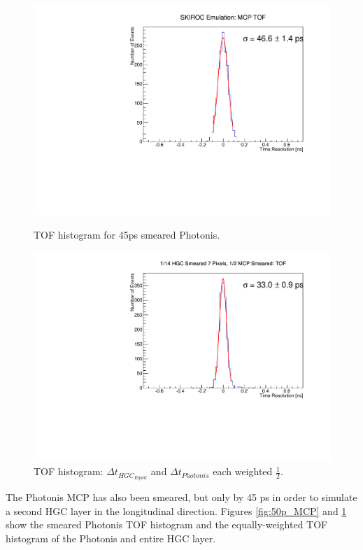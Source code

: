 \documentclass[12pt]{article}
\begin{document}
\begin{figure}[h]
\centering
\begin{minipage}[t]{.49\textwidth}
	\centering
	\includegraphics[width=\linewidth]{SKIROC/deltaTMCPSmear50.pdf}
	\caption{TOF histogram for 45ps smeared Photonis.}
	\label{fig:50p_MCP}
\end{minipage}\hfill
\begin{minipage}[t]{.49\textwidth}
	\centering
	\includegraphics[width=\linewidth]{SKIROC/deltaT_PicoSilEqual_MCP_Equal_BothSmear50.pdf}
	\caption{TOF histogram: $\Delta t_{HGC_{Equal}}$ and $\Delta t_{Photonis}$ each weighted $\frac{1}{2}$.}
	\label{fig:50ps_HGCequal_MCP}
\end{minipage}
\end{figure}

The Photonis MCP has also been smeared, but only by 45 ps in order to simulate a second HGC layer in the longitudinal direction. 
Figures \ref{fig:50p_MCP} and \ref{fig:50ps_HGCequal_MCP} show the smeared Photonis TOF histogram and the equally-weighted TOF histogram of the Photonis and entire HGC layer.
\end{document}
